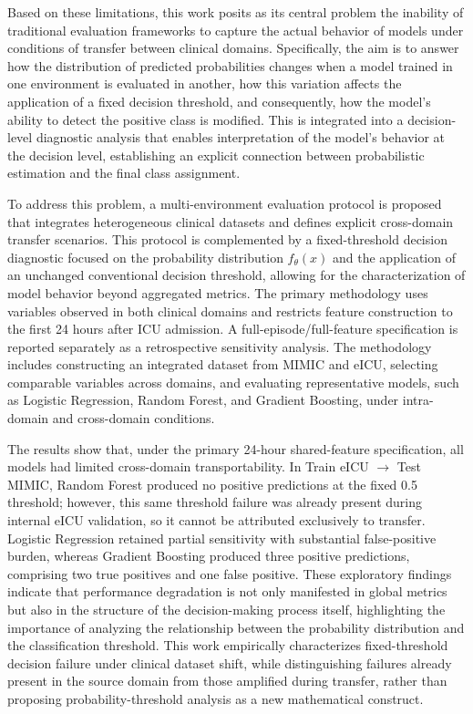 \documentclass[utf8]{FrontiersinHarvard} %
\begin{document}
Based on these limitations, this work posits as its central problem the inability of traditional evaluation frameworks to capture the actual behavior of models under conditions of transfer between clinical domains. Specifically, the aim is to answer how the distribution of predicted probabilities changes when a model trained in one environment is evaluated in another, how this variation affects the application of a fixed decision threshold, and consequently, how the model's ability to detect the positive class is modified. This is integrated into a decision-level diagnostic analysis that enables interpretation of the model's behavior at the decision level, establishing an explicit connection between probabilistic estimation and the final class assignment.

To address this problem, a multi-environment evaluation protocol is proposed that integrates heterogeneous clinical datasets and defines explicit cross-domain transfer scenarios. This protocol is complemented by a fixed-threshold decision diagnostic focused on the probability distribution $f_{\theta}(x)$ and the application of an unchanged conventional decision threshold, allowing for the characterization of model behavior beyond aggregated metrics. The primary methodology uses variables observed in both clinical domains and restricts feature construction to the first 24 hours after ICU admission. A full-episode/full-feature specification is reported separately as a retrospective sensitivity analysis. The methodology includes constructing an integrated dataset from MIMIC and eICU, selecting comparable variables across domains, and evaluating representative models, such as Logistic Regression, Random Forest, and Gradient Boosting, under intra-domain and cross-domain conditions.

The results show that, under the primary 24-hour shared-feature specification, all models had limited cross-domain transportability. In Train eICU $\rightarrow$ Test MIMIC, Random Forest produced no positive predictions at the fixed 0.5 threshold; however, this same threshold failure was already present during internal eICU validation, so it cannot be attributed exclusively to transfer. Logistic Regression retained partial sensitivity with substantial false-positive burden, whereas Gradient Boosting produced three positive predictions, comprising two true positives and one false positive. These exploratory findings indicate that performance degradation is not only manifested in global metrics but also in the structure of the decision-making process itself, highlighting the importance of analyzing the relationship between the probability distribution and the classification threshold. This work empirically characterizes fixed-threshold decision failure under clinical dataset shift, while distinguishing failures already present in the source domain from those amplified during transfer, rather than proposing probability-threshold analysis as a new mathematical construct.
\end{document}
